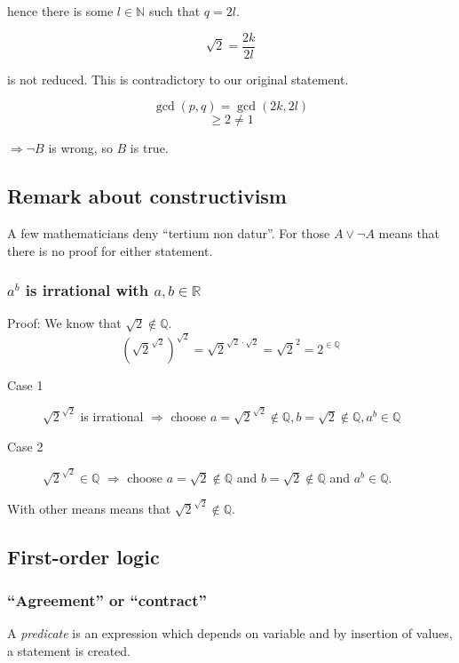 \documentclass[a4paper,landscape,twocolumn]{article}
\begin{document}
hence there is some $l \in \mathbb{N}$ such that $q = 2l$.

\[ \sqrt{2} = \frac{2k}{2l} \]

is not reduced. This is contradictory to our original statement.

\[ \operatorname{gcd}(p,q) = \operatorname{gcd}(2k, 2l) \]
\[ \geq 2 \neq 1 \]

$\Rightarrow \neg B$ is wrong, so $B$ is true.

\subsection{Remark about constructivism}

A few mathematicians deny \enquote{tertium non datur}.
For those $A \lor \neg A$ means that there is no proof for either statement.

\subsubsection{$a^b$ is irrational with $a, b \in \mathbb{R}$}
%
Proof: We know that $\sqrt{2} \not\in \mathbb{Q}$.
%
\[
    \left(\sqrt{2}^{\sqrt{2}}\right)^{\sqrt{2}}
    = \sqrt{2}^{\sqrt{2}\cdot\sqrt{2}}
    = \sqrt{2}^2
    = 2^{\in \mathbb{Q}}
\]

\begin{description}
  \item[Case 1]
    $\sqrt{2}^{\sqrt{2}}$ is irrational
    $\Rightarrow$ choose $a = \sqrt{2}^{\sqrt{2}} \not\in \mathbb{Q},
    b = \sqrt{2} \not\in \mathbb{Q}, a^b \in \mathbb{Q}$
  \item[Case 2]
    $\sqrt{2}^{\sqrt{2}} \in \mathbb{Q}$
    $\Rightarrow$ choose $a = \sqrt{2} \not\in \mathbb{Q}$ and $b = \sqrt{2} \not\in \mathbb{Q}$
    and $a^b \in \mathbb{Q}$.
\end{description}

With other means means that $\sqrt{2}^{\sqrt{2}} \not\in \mathbb{Q}$.

\subsection{First-order logic}
\subsubsection{\enquote{Agreement} or \enquote{contract}}
%
A \emph{predicate} is an expression which depends on variable and
by insertion of values, a statement is created.
\end{document}
